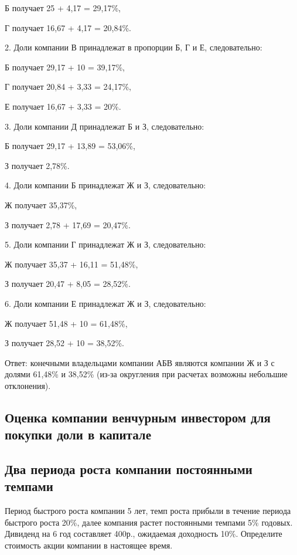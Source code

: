 \documentclass[12pt, table, a4paper,twoside]{exam}
\begin{document}
\begin{questions}
\begin{subparts}
\begin{solution}[12em]
		Б получает 25 + 4,17 = 29,17\%,
		
		Г получает 16,67 + 4,17 = 20,84\%.
		
		2. Доли компании В принадлежат в пропорции Б, Г и Е, следовательно:
		
		Б получает 29,17 + 10 = 39,17\%,
		
		Г получает 20,84 + 3,33 = 24,17\%,
		
		Е получает 16,67 + 3,33 = 20\%.
		
		3. Доли компании Д принадлежат Б и З, следовательно:
		
		Б получает 29,17 + 13,89 = 53,06\%,
		
		З получает 2,78\%.
		
		4. Доли компании Б принадлежат Ж и З, следовательно:
		
		Ж получает 35,37\%,
		
		З получает 2,78 + 17,69 = 20,47\%.
		
		5. Доли компании Г принадлежат Ж и З, следовательно:
		
		Ж получает 35,37 + 16,11 = 51,48\%,
		
		З получает 20,47 + 8,05 = 28,52\%.
		
		6. Доли компании Е принадлежат Ж и З, следовательно:
		
		Ж получает 51,48 + 10 = 61,48\%,
		
		З получает 28,52 + 10 = 38,52\%.
		
		Ответ: конечными владельцами компании АБВ являются компании Ж и З с долями 61,48\% и 38,52\% (из-за округления при расчетах возможны небольшие отклонения).
	\end{solution}
\end{subparts}
\addpoints

\subsection{Оценка компании венчурным инвестором для покупки доли в капитале}

\vfill\null\pagebreak
\subsection{Два периода роста компании постоянными темпами}
\question[10] Период быстрого роста компании 5 лет, темп роста прибыли в течение периода быстрого роста 20\%, далее компания растет постоянными темпами 5\% годовых. Дивиденд на 6 год составляет 400р., ожидаемая доходность 10\%. Определите стоимость акции компании в настоящее время.


\end{questions}
\end{document}
